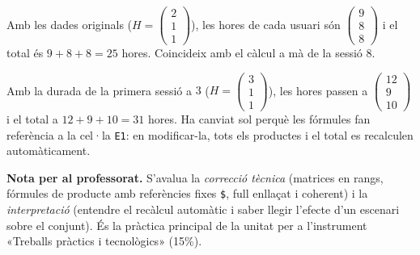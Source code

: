 \begin{solucions}
\begin{sollist}
  \item Amb les dades originals ($H=\begin{pmatrix} 2 \\ 1 \\ 1 \end{pmatrix}$), les
        hores de cada usuari són $\begin{pmatrix} 9 \\ 8 \\ 8 \end{pmatrix}$ i el
        total és $9+8+8=25$ hores. Coincideix amb el càlcul a mà de la sessió 8.
  \item Amb la durada de la primera sessió a $3$ ($H=\begin{pmatrix} 3 \\ 1 \\ 1 \end{pmatrix}$),
        les hores passen a $\begin{pmatrix} 12 \\ 9 \\ 10 \end{pmatrix}$ i el total
        a $12+9+10=31$ hores. Ha canviat sol perquè les fórmules fan referència a
        la cel·la \texttt{E1}: en modificar-la, tots els productes i el total es
        recalculen automàticament.
\end{sollist}

\noindent\textbf{Nota per al professorat.} S'avalua la \emph{correcció tècnica}
(matrices en rangs, fórmules de producte amb referències fixes \texttt{\$}, full
enllaçat i coherent) i la \emph{interpretació} (entendre el recàlcul automàtic i
saber llegir l'efecte d'un escenari sobre el conjunt). És la pràctica principal de
la unitat per a l'instrument «Treballs pràctics i tecnològics» (15\%).
\end{solucions}
